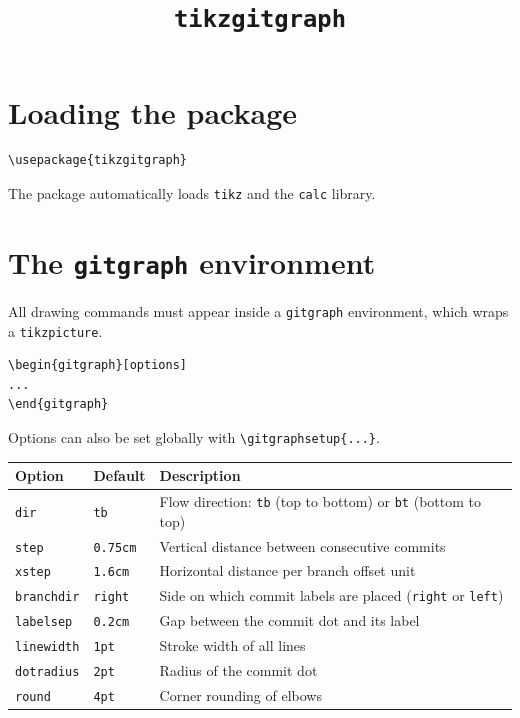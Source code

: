 \documentclass{article}
\title{\texttt{tikzgitgraph}}
\author{}
\date{}
\newcommand{\cmd}[1]{\texttt{\textbackslash#1}}
\newcommand{\opt}[1]{\texttt{#1}}
\begin{document}
    \maketitle
    \tableofcontents

    \section{Loading the package}

    \begin{verbatim}
\usepackage{tikzgitgraph}
    \end{verbatim}

    The package automatically loads \texttt{tikz} and the \texttt{calc} library.

    \section{The \texttt{gitgraph} environment}

        All drawing commands must appear inside a \texttt{gitgraph} environment, which wraps a \texttt{tikzpicture}.

        \begin{verbatim}
\begin{gitgraph}[options]
...
\end{gitgraph}
        \end{verbatim}

        Options can also be set globally with \cmd{gitgraphsetup\{...\}}.

        \bigskip
        \begin{tabularx}{\textwidth}{llX}
        \hline
        \textbf{Option} & \textbf{Default} & \textbf{Description} \\
        \hline
        \opt{dir}        & \opt{tb}       & Flow direction: \opt{tb} (top to bottom) or \opt{bt} (bottom to top) \\
        \opt{step}       & \opt{0.75cm}   & Vertical distance between consecutive commits \\
        \opt{xstep}      & \opt{1.6cm}    & Horizontal distance per branch offset unit \\
        \opt{branchdir}  & \opt{right}    & Side on which commit labels are placed (\opt{right} or \opt{left}) \\
        \opt{labelsep}   & \opt{0.2cm}    & Gap between the commit dot and its label \\
        \opt{linewidth}  & \opt{1pt}      & Stroke width of all lines \\
        \opt{dotradius}  & \opt{2pt}      & Radius of the commit dot \\
        \opt{round}      & \opt{4pt}      & Corner rounding of elbows \\
        \hline
        \end{tabularx}
\end{document}

